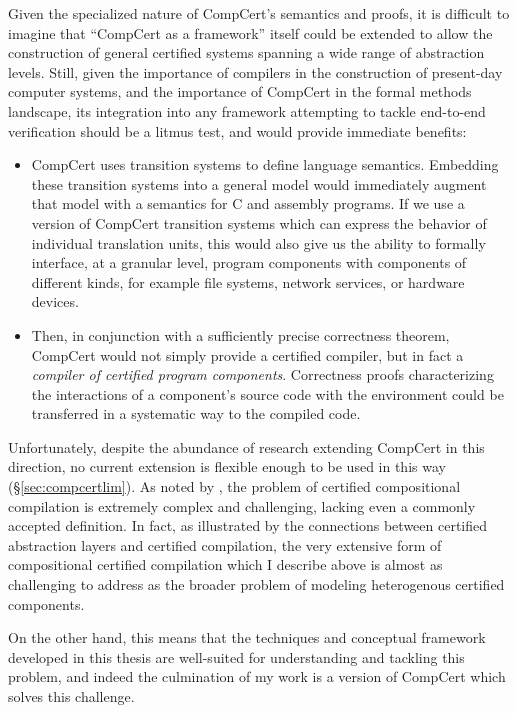 \documentclass[11pt,oneside,draft]{book}
\theoremstyle{definition}
\begin{document}
Given the specialized nature
of CompCert's semantics and proofs,
it is difficult to imagine
that ``CompCert as a framework'' itself
could be extended
to allow the construction of general certified systems
spanning a wide range of abstraction levels.
Still,
given the importance of compilers in
the construction of present-day computer systems,
and the importance of CompCert in the formal methods landscape,
its integration into any framework
attempting to tackle end-to-end verification
should be a litmus test,
and would provide immediate benefits:
\begin{itemize}
  \item
    CompCert uses transition systems to define language semantics.
    Embedding these transition systems
    into a general model
    would immediately augment that model with
    a semantics for C and assembly programs.
    If we use a version of CompCert transition systems
    which can express the behavior of individual translation units,
    this would also give us the ability to
    formally interface, at a granular level,
    program components with components of different kinds,
    for example
    file systems, network services, or hardware devices.
  \item
    Then,
    in conjunction with a sufficiently precise
    correctness theorem,
    CompCert would not simply provide
    a certified compiler,
    but in fact
    a \emph{compiler of certified program components}.
    Correctness proofs characterizing
    the interactions of a component's source code with the environment
    could be transferred in a systematic way
    to the compiled code.
\end{itemize}

Unfortunately,
despite the abundance of research
extending CompCert in this direction,
no current extension is flexible enough to be used in this way
(\S\ref{sec:compcertlim}).
As noted by \citet{next700},
the problem of certified compositional compilation
is extremely complex and challenging,
lacking even a commonly accepted definition.
In fact,
as illustrated by the connections between
certified abstraction layers and
certified compilation,
the very extensive form of
compositional certified compilation
which I describe above
is almost as challenging to address
as the broader problem of
modeling heterogenous certified components.

On the other hand,
this means that the techniques and conceptual framework
developed in this thesis
are well-suited
for understanding and tackling this problem,
and indeed the culmination of my work
is a version of CompCert
which solves this challenge.
\end{document}
